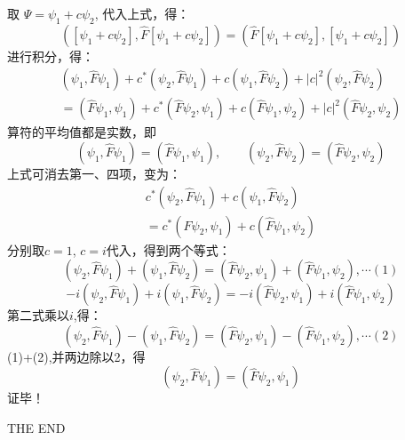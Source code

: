 \begin{frame} [allowframebreaks=]
        取 $\Psi= \psi_1+c\psi_2 $, 代入上式，得：
        $$([\psi_1+c\psi_2],\hat{F} [\psi_1+c\psi_2])=(\hat{F}[\psi_1+c\psi_2],[\psi_1+c\psi_2]) $$
        进行积分，得：
        $$
        \begin{array}{r}
        \left(\psi_{1}, \hat{F} \psi_{1}\right)+c^{*}\left(\psi_{2}, \hat{F} \psi_{1}\right)+c\left(\psi_{1}, \hat{F} \psi_{2}\right)+|c|^{2}\left(\psi_{2}, \hat{F} \psi_{2}\right) \\
        =\left(\hat{F} \psi_{1}, \psi_{1}\right)+c^{*}\left(\hat{F} \psi_{2}, \psi_{1}\right)+c\left(\hat{F} \psi_{1}, \psi_{2}\right)+|c|^{2}\left(\hat{F} \psi_{2}, \psi_{2}\right)
        \end{array}
        $$
        算符的平均值都是实数，即 
        $$(\psi_1,\hat{F}\psi_1)=(\hat{F} \psi_1, \psi_1), \qquad (\psi_2,\hat{F}\psi_2)=(\hat{F} \psi_2, \psi_2) $$
        上式可消去第一、四项，变为：
        $$\begin{array}{r}
            c^{*}\left(\psi_{2}, \hat{F} \psi_{1}\right)+c\left(\psi_{1}, \hat{F} \psi_{2}\right) \\
            =c^{*}\left(\hat{F} \psi_{2}, \psi_{1}\right)+c\left(\hat{F} \psi_{1}, \psi_{2}\right)
        \end{array}$$
        分别取$c=1$, $c=i$代入，得到两个等式：
        $$  \left(\psi_{2}, \hat{F} \psi_{1}\right)+\left(\psi_{1}, \hat{F} \psi_{2}\right) = 
        \left(\hat{F} \psi_{2}, \psi_{1}\right)+\left(\hat{F} \psi_{1}, \psi_{2}\right) , \cdots (1)
        $$
        $$
        -i\left(\psi_{2}, \hat{F} \psi_{1}\right)+i\left(\psi_{1}, \hat{F} \psi_{2}\right) 
        =-i\left(\hat{F} \psi_{2}, \psi_{1}\right)+i\left(\hat{F} \psi_{1}, \psi_{2}\right)
        $$
        第二式乘以$i$,得：
        $$
        \left(\psi_{2}, \hat{F} \psi_{1}\right)-\left(\psi_{1}, \hat{F} \psi_{2}\right) 
        =\left(\hat{F} \psi_{2}, \psi_{1}\right)-\left(\hat{F} \psi_{1}, \psi_{2}\right), \cdots (2)
        $$
        (1)+(2),并两边除以2，得
        $$
        \left(\psi_{2}, \hat{F} \psi_{1}\right) =\left(\hat{F} \psi_{2}, \psi_{1}\right)
        $$
        证毕！
\end{frame} 

\begin{frame} [allowframebreaks=]
    THE END
\end{frame} 